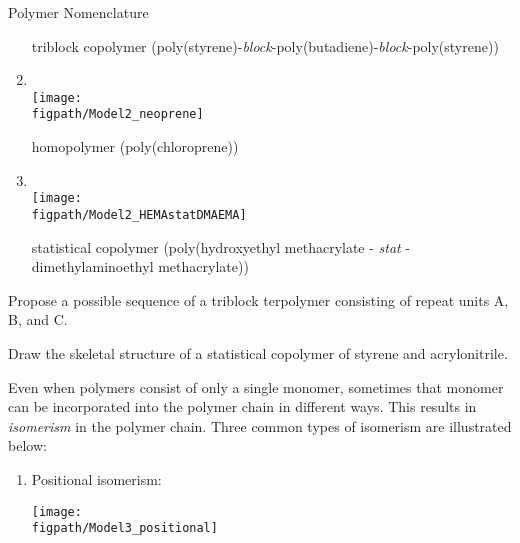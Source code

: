 \begin{activity}{Polymer Nomenclature}
\begin{ctqs}
\begin{enumerate}
				\begin{solution}[0.25in]
					triblock copolymer (poly(styrene)-\emph{block}-poly(butadiene)-\emph{block}-poly(styrene))
				\end{solution}
			
			\item \text{}\\\texttt{[image: \\figpath/Model2\_neoprene]}
			
				\begin{solution}[0.25in]
					homopolymer (poly(chloroprene))
				\end{solution}
			
			\item \text{}\\\texttt{[image: \\figpath/Model2\_HEMAstatDMAEMA]}
			
				\begin{solution}[0.25in]
					statistical copolymer (poly(hydroxyethyl methacrylate - \emph{stat} - dimethylaminoethyl methacrylate))
				\end{solution}
			
		\end{enumerate}
		
	\question Propose a possible sequence of a triblock terpolymer consisting of repeat units A, B, and C.
	
		\begin{solution}[0.5in]
		\end{solution}
	
	\question Draw the skeletal structure of a statistical copolymer of styrene and acrylonitrile.
	
		\begin{solution}[1in]
		\end{solution}
	
\end{ctqs}


\clearpage
\begin{model}[Isomerism]

	Even when polymers consist of only a single monomer, sometimes that monomer can be incorporated into the polymer chain in different ways.  This results in \textit{isomerism} in the polymer chain.  Three common types of isomerism are illustrated below:
	
	\begin{enumerate}
		\item Positional isomerism:
		
			\centerline{\texttt{[image: \\figpath/Model3\_positional]}}
		

\end{enumerate}
\end{model}
\end{activity}
